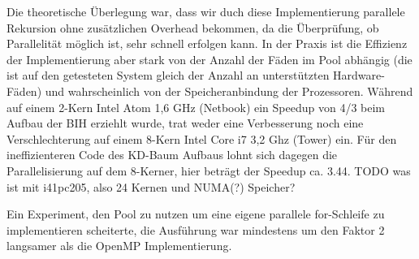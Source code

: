 Die theoretische Überlegung war, dass wir duch diese Implementierung parallele Rekursion ohne zusätzlichen Overhead bekommen, da die Überprüfung, ob Parallelität möglich ist, sehr schnell erfolgen kann. In der Praxis ist die Effizienz der Implementierung aber stark von der Anzahl der Fäden im Pool abhängig (die ist auf den getesteten System gleich der Anzahl an unterstützten Hardware-Fäden) und wahrscheinlich von der Speicheranbindung der Prozessoren. Während auf einem 2-Kern Intel Atom 1,6 GHz (Netbook) ein Speedup von 4/3 beim Aufbau der BIH erziehlt wurde, trat weder eine Verbesserung noch eine Verschlechterung auf einem 8-Kern Intel Core i7 3,2 Ghz (Tower) ein. Für den ineffizienteren Code des KD-Baum Aufbaus lohnt sich dagegen die Parallelisierung auf dem 8-Kerner, hier beträgt der Speedup ca. 3.44. TODO was ist mit i41pc205, also 24 Kernen und NUMA(?) Speicher?

Ein Experiment, den Pool zu nutzen um eine eigene parallele for-Schleife zu implementieren scheiterte, die Ausführung war mindestens um den Faktor 2 langsamer als die OpenMP Implementierung.
